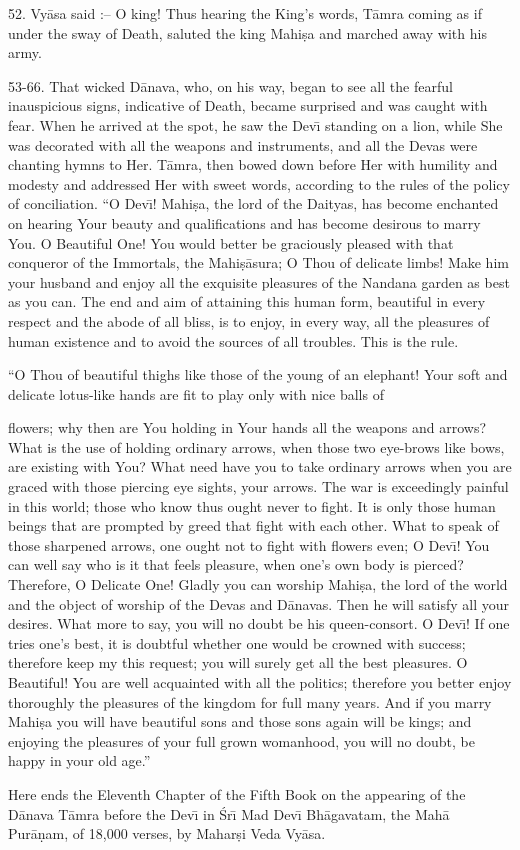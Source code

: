 52. Vy\=asa said :-- O king! Thus hearing the King's words, T\=amra coming as if under the sway of Death, saluted the king Mahi\d{s}a and marched away with his army.

53-66. That wicked D\=anava, who, on his way, began to see all the fearful inauspicious signs, indicative of Death, became surprised and was caught with fear. When he arrived at the spot, he saw the Dev\={\i} standing on a lion, while She was decorated with all the weapons and instruments, and all the Devas were chanting hymns to Her. T\=amra, then bowed down before Her with humility and modesty and addressed Her with sweet words, according to the rules of the policy of conciliation. ``O Dev\={\i}! Mahi\d{s}a, the lord of the Daityas, has become enchanted on hearing Your beauty and qualifications and has become desirous to marry You. O Beautiful One! You would better be graciously pleased with that conqueror of the Immortals, the Mahi\d{s}\=asura; O Thou of delicate limbs! Make him your husband and enjoy all the exquisite pleasures of the Nandana garden as best as you can. The end and aim of attaining this human form, beautiful in every respect and the abode of all bliss, is to enjoy, in every way, all the pleasures of human existence and to avoid the sources of all troubles. This is the rule.

``O Thou of beautiful thighs like those of the young of an elephant! Your soft and delicate lotus-like hands are fit to play only with nice balls of

flowers; why then are You holding in Your hands all the weapons and arrows? What is the use of holding ordinary arrows, when those two eye-brows like bows, are existing with You? What need have you to take ordinary arrows when you are graced with those piercing eye sights, your arrows. The war is exceedingly painful in this world; those who know thus ought never to fight. It is only those human beings that are prompted by greed that fight with each other. What to speak of those sharpened arrows, one ought not to fight with flowers even; O Dev\={\i}! You can well say who is it that feels pleasure, when one's own body is pierced? Therefore, O Delicate One! Gladly you can worship Mahi\d{s}a, the lord of the world and the object of worship of the Devas and D\=anavas. Then he will satisfy all your desires. What more to say, you will no doubt be his queen-consort. O Dev\={\i}! If one tries one's best, it is doubtful whether one would be crowned with success; therefore keep my this request; you will surely get all the best pleasures. O Beautiful! You are well acquainted with all the politics; therefore you better enjoy thoroughly the pleasures of the kingdom for full many years. And if you marry Mahi\d{s}a you will have beautiful sons and those sons again will be kings; and enjoying the pleasures of your full grown womanhood, you will no doubt, be happy in your old age.''

Here ends the Eleventh Chapter of the Fifth Book on the appearing of the D\=anava T\=amra before the Dev\={\i} in \'Sr\={\i} Mad Dev\={\i} Bh\=agavatam, the Mah\=a Pur\=a\d{n}am, of 18,000 verses, by Mahar\d{s}i Veda Vy\=asa.



